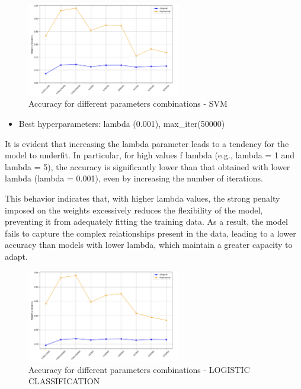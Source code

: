 \documentclass[a4paper, 10pt]{article}
\begin{document}
\begin{figure}[H]
    \centering
    \includegraphics[width=0.6\textwidth]{images/polySVM.png}
    \caption{Accuracy for different parameters combinations - SVM}
    \label{fig:polySVM}
\end{figure}

\begin{itemize}
    \item Best hyperparameters: lambda (0.001), max\_iter(50000)
\end{itemize}

It is evident that increasing the lambda parameter leads to a tendency for the model to underfit. In particular, for high values f lambda (e.g., lambda = 1 and lambda = 5), the accuracy is significantly lower than that obtained with lower lambda (lambda = 0.001), even by increasing the number of iterations.

This behavior indicates that, with higher lambda values, the strong penalty imposed on the weights excessively reduces the flexibility of the model, preventing it from adequately fitting the training data. As a result, the model fails to capture the complex relationships present in the data, leading to a lower accuracy than models with lower lambda, which maintain a greater capacity to adapt.

\begin{figure}[H]
    \centering
    \includegraphics[width=0.6\textwidth]{images/polyLOG.png}
    \caption{Accuracy for different parameters combinations - LOGISTIC CLASSIFICATION}
    \label{fig:polyLOG}
\end{figure}
\end{document}
